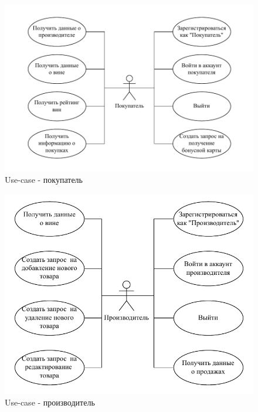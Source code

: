 \begin{figure}[H]
	\begin{center}
		\includegraphics[scale=0.8]{img/customer.pdf}
	\end{center}
	\captionsetup{justification=centering}
	\caption{Use-case - покупатель}
	\label{img:customer}
\end{figure}

\begin{figure}[H]
	\begin{center}
		\includegraphics[scale=0.8]{img/manufacturer.pdf}
	\end{center}
	\captionsetup{justification=centering}
	\caption{Use-case - производитель}
	\label{img:manufacturer}
\end{figure}

